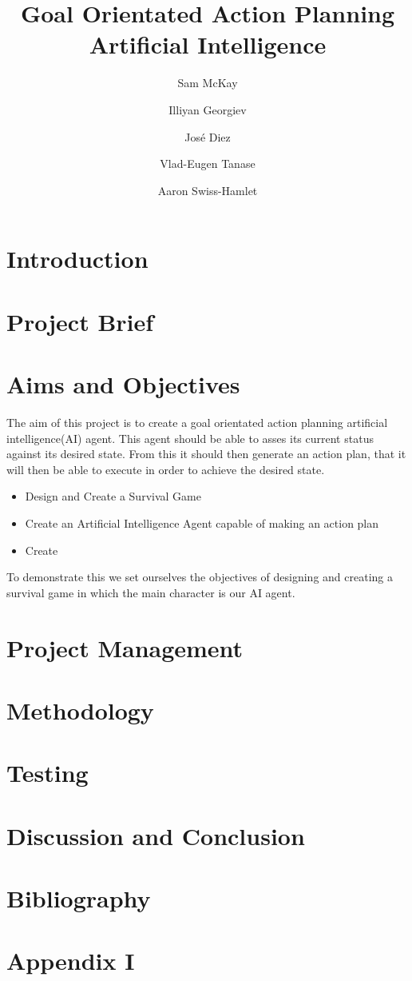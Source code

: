 \documentclass{report}
\begin{document}
\title{Goal Orientated Action Planning Artificial Intelligence}
\author{Sam McKay \and Illiyan Georgiev \and ‎José Diez\and Vlad-Eugen Tanase \and Aaron Swiss-Hamlet }
\maketitle
\tableofcontents
\chapter{Introduction}
\chapter{Project Brief}
\chapter{Aims and Objectives}
The aim of this project is to create a goal orientated action planning artificial intelligence(AI) agent. This agent should be able to asses its current status against its desired state. From this it should then generate an action plan, that it will then be able to execute in order to achieve the desired state. \newline

\begin{itemize}
	\item Design and Create a Survival Game
	\item Create an Artificial Intelligence Agent capable of making an action plan
	\item Create 
\end{itemize}

To demonstrate this we set ourselves the objectives of designing and creating a survival game in which the main character is our AI agent.  
\chapter{Project Management}
\chapter{Methodology}
\chapter{Testing}
\chapter{Discussion and Conclusion}
\chapter{Bibliography}
\appendix
\chapter{Appendix I}
\end{document}
